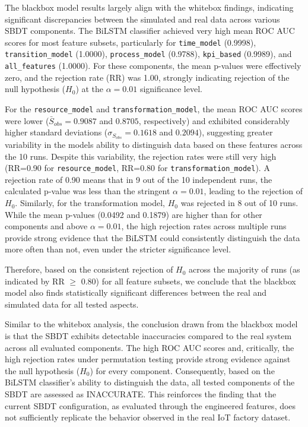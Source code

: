 The blackbox model results largely align with the whitebox findings, indicating significant discrepancies between the simulated and real data across various SBDT components. The BiLSTM classifier achieved very high mean ROC AUC scores for most feature subsets, particularly for \texttt{time\_model} (0.9998), \texttt{transition\_model} (1.0000), \texttt{process\_model} (0.9788), \texttt{kpi\_based} (0.9989), and \texttt{all\_features} (1.0000). For these components, the mean p-values were effectively zero, and the rejection rate (RR) was 1.00, strongly indicating rejection of the null hypothesis ($H_0$) at the $\alpha = 0.01$ significance level.

For the \texttt{resource\_model} and \texttt{transformation\_model}, the mean ROC AUC scores were lower ($\bar{S}_{obs}=0.9087$ and $0.8705$, respectively) and exhibited considerably higher standard deviations ($\sigma_{S_{obs}}=0.1618$ and $0.2094$), suggesting greater variability in the models ability to distinguish data based on these features across the 10 runs. Despite this variability, the rejection rates were still very high (RR=0.90 for \texttt{resource\_model}, RR=0.80 for \texttt{transformation\_model}). A rejection rate of 0.90 means that in 9 out of the 10 independent runs, the calculated p-value was less than the stringent $\alpha=0.01$, leading to the rejection of $H_0$. Similarly, for the transformation model, $H_0$ was rejected in 8 out of 10 runs. While the mean p-values (0.0492 and 0.1879) are higher than for other components and above $\alpha=0.01$, the high rejection rates across multiple runs provide strong evidence that the BiLSTM could consistently distinguish the data more often than not, even under the stricter significance level.

Therefore, based on the consistent rejection of $H_0$ across the majority of runs (as indicated by RR $\ge$ 0.80) for all feature subsets, we conclude that the blackbox model also finds statistically significant differences between the real and simulated data for all tested aspects.

Similar to the whitebox analysis, the conclusion drawn from the blackbox model is that the SBDT exhibits detectable inaccuracies compared to the real system across all evaluated components. The high ROC AUC scores and, critically, the high rejection rates under permutation testing provide strong evidence against the null hypothesis ($H_0$) for every component. Consequently, based on the BiLSTM classifier's ability to distinguish the data, all tested components of the SBDT are assessed as INACCURATE. This reinforces the finding that the current SBDT configuration, as evaluated through the engineered features, does not sufficiently replicate the behavior observed in the real IoT factory dataset.